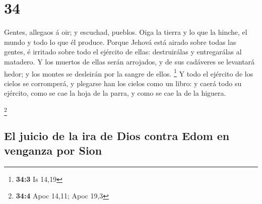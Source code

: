 \hypertarget{section-33}{%
\section{34}\label{section-33}}

 Gentes, allegaos á oir; y escuchad, pueblos. Oiga la
tierra y lo que la hinche, el mundo y todo lo que él produce.
 Porque Jehová está airado sobre todas las gentes, é
irritado sobre todo el ejército de ellas: destruirálas y entregarálas al
matadero.  Y los muertos de ellas serán arrojados, y de
sus cadáveres se levantará hedor; y los montes se desleirán por la
sangre de ellos. \footnote{\textbf{34:3} Is 14,19}  Y todo
el ejército de los cielos se corromperá, y plegarse han los cielos como
un libro: y caerá todo su ejército, como se cae la hoja de la parra, y
como se cae la de la higuera.

\footnote{\textbf{34:4} Apoc 14,11; Apoc 19,3}

\hypertarget{el-juicio-de-la-ira-de-dios-contra-edom-en-venganza-por-sion}{%
\subsection{El juicio de la ira de Dios contra Edom en venganza por
Sion}\label{el-juicio-de-la-ira-de-dios-contra-edom-en-venganza-por-sion}}

